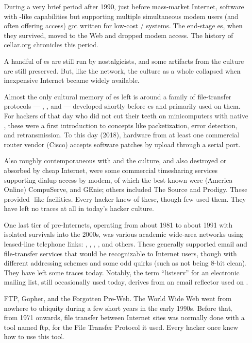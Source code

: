 During a very brief period after 1990, just before mass-market Internet,
software with -like capabilities but supporting multiple simultaneous modem
users (and often offering  access) got written for low-cost \UNIX/ systems.
The end-stage es, when they survived, moved to the Web and dropped modem
access. The history of cellar.org chronicles this period.

A handful of es are still run by nostalgicists, and some artifacts from the
culture are still preserved. But, like the  network, the  culture as a
whole collapsed when inexpensive Internet became widely available.

Almost the only cultural memory of es left is around a family of
file-transfer protocols --- , , and  --- developed shortly before
es and primarily used on them. For hackers of that day who did not cut their
teeth on minicomputers with native , these were a first introduction to
concepts like packetization, error detection, and retransmission. To this day
(2018), hardware from at least one commercial router vendor (Cisco) accepts
software patches by  upload through a serial port.

Also roughly contemporaneous with  and the  culture, and also
destroyed or absorbed by cheap Internet, were some commercial timesharing
services supporting dialup access by modem, of which the best known were 
(America Online) CompuServe, and GEnie; others included The Source and Prodigy.
These provided -like facilities. Every hacker knew of these, though few used
them. They have left no traces at all in today's hacker culture.

One last tier of pre-Internets, operating from about 1981 to about 1991 with
isolated survivals into the 2000s, was various academic wide-area networks
using leased-line telephone links: , , , , and others.
These generally supported email and file-transfer services that would be
recognizable to Internet users, though with different addressing schemes and
some odd quirks (such as not being 8-bit clean). They have left some traces
today. Notably, the term ``listserv'' for an electronic mailing list, still
occasionally used today, derives from an email reflector used on .

\sect FTP, Gopher, and the Forgotten Pre-Web.
The World Wide Web went from nowhere to ubiquity during a few short years in
the early 1990s. Before that, from 1971 onwards, file transfer between Internet
sites was normally done with a tool named ftp, for the File Transfer Protocol
it used. Every hacker once knew how to use this tool.

